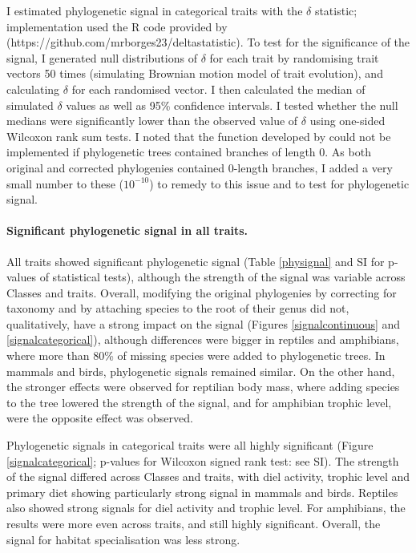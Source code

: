 I estimated phylogenetic signal in categorical traits with the $\delta$ statistic; implementation used the R code provided by \cite{Borges2018} (https://github.com/mrborges23/delta\textunderscore statistic). To test for the significance of the signal, I generated null distributions of $\delta$  for each trait by randomising trait vectors 50 times (simulating Brownian motion model of trait evolution), and calculating $\delta$ for each randomised vector. I then calculated the median of simulated $\delta$ values as well as 95\% confidence intervals. I tested whether the null medians were significantly lower than the observed value of $\delta$ using one-sided Wilcoxon rank sum tests. I noted that the function developed by \cite{Borges2018} could not be implemented if phylogenetic trees contained branches of length 0. As both original and corrected phylogenies contained 0-length branches, I added a very small number to these ($10^{-10}$) to remedy to this issue and to test for phylogenetic signal. 

\paragraph{Significant phylogenetic signal in all traits.}
All traits showed significant phylogenetic signal (Table \ref{physignal} and SI for p-values of statistical tests), although the strength of the signal was variable across Classes and traits. Overall, modifying the original phylogenies by correcting for taxonomy and by attaching species to the root of their genus did not, qualitatively, have a strong impact on the signal (Figures \ref{signalcontinuous} and \ref{signalcategorical}), although differences were bigger in reptiles and amphibians, where more than 80\% of missing species were added to phylogenetic trees. In mammals and birds, phylogenetic signals remained similar. On the other hand, the stronger effects were observed for reptilian body mass, where adding species to the tree lowered the strength of the signal, and for amphibian trophic level, were the opposite effect was observed.

Phylogenetic signals in categorical traits were all highly significant (Figure \ref{signalcategorical}; p-values for Wilcoxon signed rank test: see SI). The strength of the signal differed across Classes and traits, with diel activity, trophic level and primary diet showing particularly strong signal in mammals and birds. Reptiles also showed strong signals for diel activity and trophic level. For amphibians, the results were more even across traits, and still highly significant. Overall, the signal for habitat specialisation was less strong.

